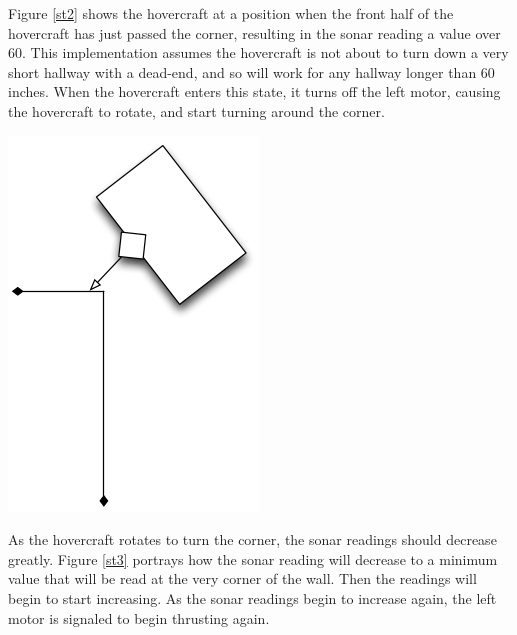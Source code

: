 Figure \ref{st2} shows the hovercraft at a position when the front half of the hovercraft has just passed  the corner, resulting in the sonar reading a value over 60. This implementation assumes the hovercraft is not about to turn down a very short hallway with a dead-end, and so will work for any hallway longer than 60 inches. When the hovercraft enters this state, it turns off the left motor, causing the hovercraft to rotate, and start turning around the corner.

\begin{center}
 \includegraphics[scale=0.5]{imageSources/sonarturn3.png}
\end{center}
\label{st3}

As the hovercraft rotates to turn the corner, the sonar readings should decrease greatly. Figure \ref{st3} portrays how the sonar reading will decrease to a minimum value that will be read at the very corner of the wall. Then the readings will begin to start increasing. As the sonar readings begin to increase again, the left motor is signaled to begin thrusting again.

